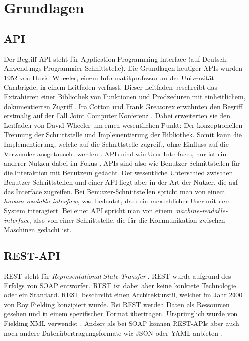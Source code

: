 \chapter{Grundlagen}
\section{API}

Der Begriff API steht für Application Programming Interface (auf Deutsch: Anwendungs-Programmier-Schnittstelle).
Die Grundlagen heutiger APIs wurden 1952 von David Wheeler, einem Informatikprofessor an der Universität Cambrigde, in einem Leitfaden verfasst.
Dieser Leitfaden beschreibt das Extrahieren einer Bibliothek von Funktionen und Prodzeduren mit einheitlichem, dokumentierten Zugriff \cite[S.5-6]{wheeler1952use}.
Ira Cotton und Frank Greatorex erwähnten den Begriff erstmalig auf der Fall Joint Computer Konferenz \cite[S.5]{cotton1968data}.
Dabei erweiterten sie den Leitfaden von David Wheeler um einen wesentlichen Punkt: Der konzeptionellen Trennung der Schnittstelle und Implementierung der Bibliothek.
Somit kann die Implementierung, welche auf die Schnittstelle zugreift, ohne Einfluss auf die Verwender ausgetauscht werden \cite[S.2]{kress2020graphql}.
APIs sind wie User Interfaces, nur ist ein anderer Nutzen dabei im Fokus \cite[S.5]{berlind2017apis}.
APIs sind also wie Benutzer-Schnittstellen für die Interaktion mit Benutzern gedacht.
Der wesentliche Unterschied zwischen Benutzer-Schnittstellen und einer API liegt aber in der Art der Nutzer, die auf das Interface zugreifen.
Bei Benutzer-Schnittstellen spricht man von einem \textit{human-readable-interface}, was bedeutet, dass ein menschlicher User mit dem System interagiert.
Bei einer API spricht man von einem \textit{machine-readable-interface}, also von einer Schnittstelle, die für die Kommunikation zwischen Maschinen gedacht ist.

\section{REST-API}
REST steht für \textit{Representational State Transfer} \cite[S.235-236]{wheeler1952use}.
REST wurde aufgrund des Erfolgs von SOAP entworfen. \cite[Abs. REST APIs]{graphcms}
REST ist dabei aber keine konkrete Technologie oder ein Standard.
REST beschreibt einen Architekturstil, welcher im Jahr 2000 von Roy Fielding konzipiert wurde.
Bei REST werden Daten als Ressourcen gesehen und in einem spezifischen Format übertragen.
Ursprünglich wurde von Fielding XML verwendet \cite[S.11]{kress2020graphql}.
Anders als bei SOAP können REST-APIs aber auch noch andere Datenübertragungsformate wie JSON oder YAML anbieten \cite[Abs. REST APIs]{graphcms}.
\newline

